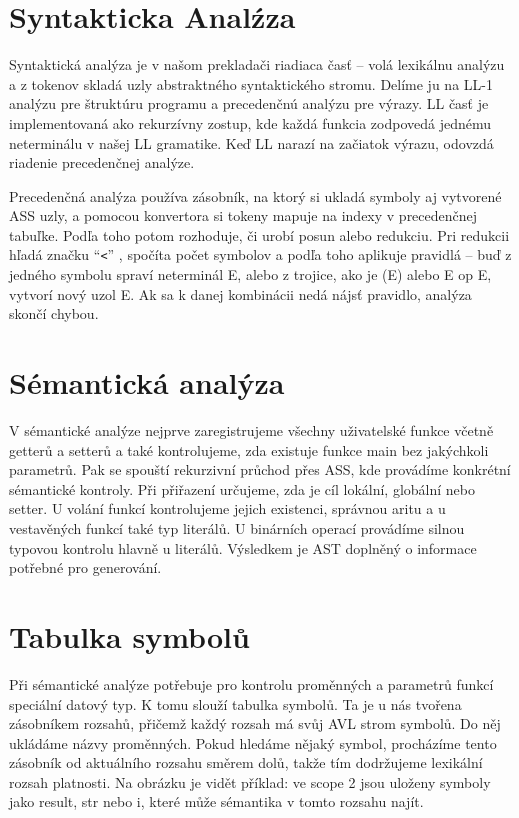 \documentclass{article}
\begin{document}
\section{Syntakticka Analźza}
Syntaktická analýza je v našom prekladači riadiaca časť – volá lexikálnu analýzu a z tokenov skladá uzly abstraktného syntaktického stromu. Delíme ju na LL-1 analýzu pre štruktúru programu a precedenčnú analýzu pre výrazy.
LL časť je implementovaná ako rekurzívny zostup, kde každá funkcia zodpovedá jednému neterminálu v našej LL gramatike. Keď LL narazí na začiatok výrazu, odovzdá riadenie precedenčnej analýze.

Precedenčná analýza používa zásobník, na ktorý si ukladá symboly aj vytvorené ASS uzly, a pomocou konvertora si tokeny mapuje na indexy v precedenčnej tabuľke. Podľa toho potom rozhoduje, či urobí posun alebo redukciu.
Pri redukcii hľadá značku ``\verb|<|'' , spočíta počet symbolov a podľa toho aplikuje pravidlá – buď z jedného symbolu spraví neterminál E, alebo z trojice, ako je (E) alebo E op E, vytvorí nový uzol E. Ak sa k danej kombinácii nedá nájsť pravidlo, analýza skončí chybou.

\section{Sémantická analýza}
V sémantické analýze nejprve zaregistrujeme všechny uživatelské funkce včetně getterů a setterů a také kontrolujeme, zda existuje funkce main bez jakýchkoli parametrů. Pak se spouští rekurzivní průchod přes ASS, kde provádíme konkrétní sémantické kontroly.
Při přiřazení určujeme, zda je cíl lokální, globální nebo setter. U volání funkcí kontrolujeme jejich existenci, správnou aritu a u vestavěných funkcí také typ literálů.
U binárních operací provádíme silnou typovou kontrolu hlavně u literálů.
Výsledkem je AST doplněný o informace potřebné pro generování.

\section{Tabulka symbolů}
Při sémantické analýze potřebuje pro kontrolu proměnných a parametrů funkcí speciální datový typ. K tomu slouží tabulka symbolů. Ta je u nás tvořena zásobníkem rozsahů, přičemž každý rozsah má svůj AVL strom symbolů. Do něj ukládáme názvy proměnných. Pokud hledáme nějaký symbol, procházíme tento zásobník od aktuálního rozsahu směrem dolů, takže tím dodržujeme lexikální rozsah platnosti. Na obrázku je vidět příklad: ve scope 2 jsou uloženy symboly jako result, str nebo i, které může sémantika v tomto rozsahu najít.
\end{document}
